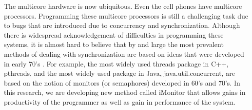 \documentclass[preprint]{sigplanconf}
\begin{document}




The multicore hardware is now ubiquitous. Even the cell phones have
multicore processors. Programming these multicore processors is
still a challenging task due to
bugs that are introduced due to concurrency and synchronization.
Although there is widespread acknowledgement of difficulties 
in programming these systems, it is almost hard to believe that 
by and large the most prevalent methods of dealing with synchronization are
based on ideas that were developed in early 70's \cite{hoa74, han75}. For 
example, the most widely used threads package in C++, pthreads, and
the most widely used package in Java, java.util.concurrent, are based
on the notion of monitors (or semaphores) developed in 60's and 70's.
In this research, we are developing new method called iMonitor 
that allows gains in productivity of the programmer as well as gain in
performance of the system.
\end{document}
